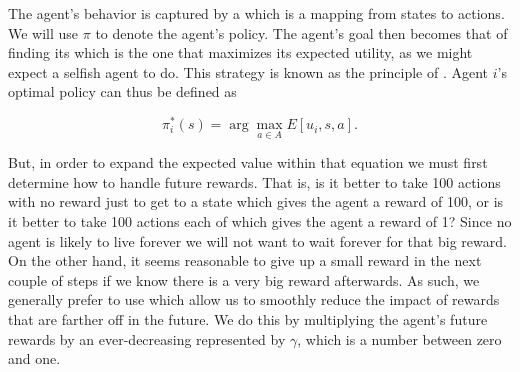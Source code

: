 The agent's behavior is captured by a  which is a mapping
from states to actions. We will use $\pi$ to denote the agent's
policy. The agent's goal then becomes that of finding its  which is the one that maximizes its expected utility, as we
might expect a selfish agent to do. This strategy is known as the
principle of . Agent $i$'s optimal policy
can thus be defined as

\begin{equation}
  \label{eq:mod-meu}
  \pi^*_i(s) = \arg \max_{a \in A} E[u_i,s,a].
\end{equation}

But, in order to expand the expected value within that equation we
must first determine how to handle future rewards.  That is, is it
better to take 100 actions with no reward just to get to a state which
gives the agent a reward of 100, or is it better to take 100 actions
each of which gives the agent a reward of 1? Since no agent is likely
to live forever we will not want to wait forever for that big reward.
On the other hand, it seems reasonable to give up a small reward in
the next couple of steps if we know there is a very big reward
afterwards. As such, we generally prefer to use  which allow us to smoothly reduce the impact of rewards
that are farther off in the future. We do this by multiplying the
agent's future rewards by an ever-decreasing 
represented by $\gamma$, which is a number between zero and one.

